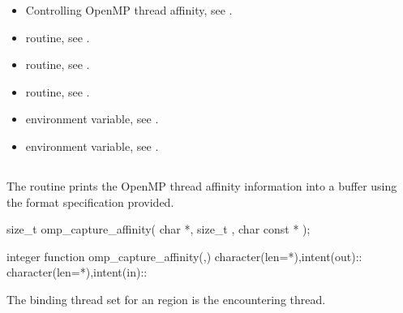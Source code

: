 \crossreferences
\begin{itemize}
\item Controlling OpenMP thread affinity, see
.

\item {} routine, 
see .

\item {} routine, 
see .

\item {} routine, see .

\item {} environment variable, see
.

\item {} environment variable, see
.
\end{itemize}


\subsection{}
\label{subsec:omp_capture_affinity}

\summary
The  routine prints the OpenMP thread 
affinity information into a buffer using the format specification provided.


\format
\begin{ccppspecific}
\begin{ompcFunction}
size_t omp_capture_affinity(
  char *,
  size_t ,
  char const *
);
\end{ompcFunction}
\end{ccppspecific}

\begin{fortranspecific}
\begin{ompfFunction}
integer function omp_capture_affinity(,)
character(len=*),intent(out)::
character(len=*),intent(in)::
\end{ompfFunction}
\end{fortranspecific}

\binding
The binding thread set for an  region 
is the encountering thread.

